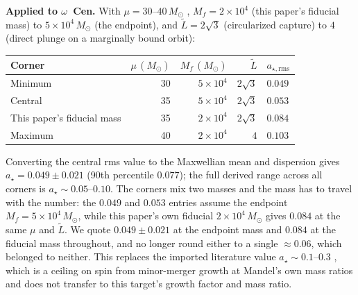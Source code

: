 \documentclass[11pt]{article}
\newcommand{\msun}{\ensuremath{M_\odot}}
\newcommand{\astar}{\ensuremath{a_\star}}
\newcommand{\ocen}{\ensuremath{\omega}~Cen}
\begin{document}
\textbf{Applied to \ocen.} With $\mu = 30$--$40\,\msun$ \citep{GonzalezPrieto2025}, $M_{f} = 2\times10^{4}$ (this paper's fiducial mass) to $5\times10^{4}\,\msun$ (the \citet{GonzalezPrieto2025} endpoint), and $\tilde L = 2\sqrt3$ (circularized capture) to $4$ (direct plunge on a marginally bound orbit):
\begin{center}
\small
\begin{tabular}{lrrrl}
\toprule
Corner & $\mu\,(\msun)$ & $M_{f}\,(\msun)$ & $\tilde L$ & $a_{\star,\mathrm{rms}}$ \\
\midrule
Minimum & 30 & $5\times10^{4}$ & $2\sqrt3$ & $0.049$ \\
Central & 35 & $5\times10^{4}$ & $2\sqrt3$ & $0.053$ \\
This paper's fiducial mass & 35 & $2\times10^{4}$ & $2\sqrt3$ & $0.084$ \\
Maximum & 40 & $2\times10^{4}$ & $4$ & $0.103$ \\
\bottomrule
\end{tabular}
\end{center}
Converting the central rms value to the Maxwellian mean and dispersion gives $\astar = 0.049 \pm 0.021$ (90th percentile $0.077$); the full derived range across all corners is $\astar \sim 0.05$--$0.10$. The corners mix two masses and the mass has to travel with the number: the $0.049$ and $0.053$ entries assume the \citet{GonzalezPrieto2025} endpoint $M_{f} = 5\times10^{4}\,\msun$, while this paper's own fiducial $2\times10^{4}\,\msun$ gives $0.084$ at the same $\mu$ and $\tilde L$. We quote $0.049 \pm 0.021$ at the endpoint mass and $0.084$ at the fiducial mass throughout, and no longer round either to a single $\approx 0.06$, which belonged to neither. This replaces the imported literature value $\astar \sim 0.1$--$0.3$ \citep{Mandel2008}, which is a ceiling on spin from minor-merger growth at Mandel's own mass ratios and does not transfer to this target's growth factor and mass ratio.
\end{document}
